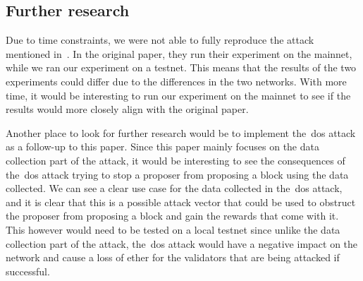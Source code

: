 \subsection{Further research}\label{subsec:further-research}
Due to time constraints, we were not able to fully reproduce the attack mentioned in~\cite{heimbach2024deanonymizingethereumvalidatorsp2p}.
In the original paper, they run their experiment on the mainnet, while we ran our experiment on a testnet.
This means that the results of the two experiments could differ due to the differences in the two networks.
With more time, it would be interesting to run our experiment on the mainnet to see if the results would more closely align with the original paper.


Another place to look for further research would be to implement the~\gls{dos} attack as a follow-up to this paper.
Since this paper mainly focuses on the data collection part of the attack, it would be interesting to see the consequences of the~\gls{dos} attack trying to stop a proposer from proposing a block using the data collected.
We can see a clear use case for the data collected in the~\gls{dos} attack, and it is clear that this is a possible attack vector that could be used to obstruct the proposer from proposing a block and gain the rewards that come with it.
This however would need to be tested on a local testnet since unlike the data collection part of the attack, the~\gls{dos} attack would have a negative impact on the network and cause a loss of ether for the validators that are being attacked if successful.